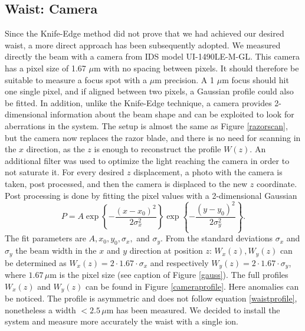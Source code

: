 \subsection{Waist: Camera}
\label{waistcamera}
Since the Knife-Edge method did not prove that we had achieved our desired waist, a  more direct approach has been subsequently adopted. We measured directly the beam with a camera from IDS model UI-1490LE-M-GL. This camera has a pixel size of 1.67 $\mu$m with no spacing between pixels. It should therefore be suitable to measure a focus spot with a $\mu$m precision. A 1 $\mu$m focus should hit one single pixel, and if aligned between two pixels, a Gaussian profile could also be fitted.
In addition, unlike the Knife-Edge technique, a camera provides 2-dimensional information about the beam shape and can be exploited to look for aberrations in the system. The setup is almost the same as Figure \ref{razorscan}, but the camera now replaces the razor blade, and there is no need for scanning in the $x$ direction, as the $z$ is enough to reconstruct the profile $W(z)$. An additional filter was used to optimize the light reaching the camera in order to not saturate it.
%
For every desired $z$ displacement, a photo with the camera is taken, post processed, and then the camera is displaced to the new $z$ coordinate. Post processing is done by fitting the pixel values with a 2-dimensional Gaussian
\begin{equation}
P = A \exp\left\{-\frac{(x-x_0)^2}{2\sigma_x^2}\right\} \exp\left\{-\frac{(y-y_0)^2}{2\sigma_y^2} \right\}.
\end{equation}
The fit parameters are $A,x_0,y_0,\sigma_x,$ and $\sigma_y$. From the standard deviations $\sigma_x$ and $\sigma_y$ the beam width in the $x$ and $y$ direction at position $z$: $W_x(z),W_y(z)$ can be determined as $W_x(z) = 2\cdot 1.67\cdot \sigma_x$ and respectively $W_y(z) = 2\cdot 1.67\cdot \sigma_y$, where $1.67\,\mu$m is the pixel size (see caption of Figure \ref{gauss}). The full profiles $W_x(z)$ and $W_{y}(z)$ can be found in Figure \ref{cameraprofile}. Here anomalies can be noticed. The profile is asymmetric and does not follow equation \ref{waistprofile}, nonetheless a width $<2.5\,\mu$m has been measured. We decided to install the system and measure more accurately the waist with a single ion.
